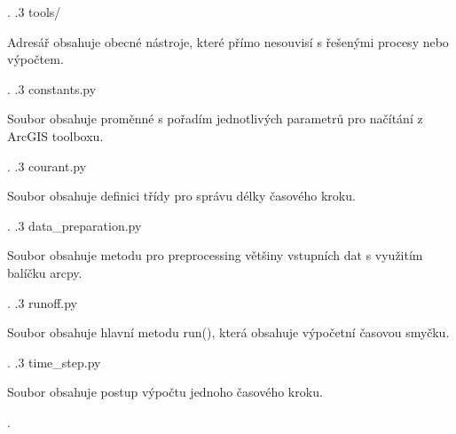 \documentclass[%
    ,float=false %
    ,preview=true
    ,class=scrartcl
    ,fontsize=12pt
    ]{standalone}
\def\pomer{0.5}
\begin{document}
{\begin{minipage}[t]{\pomer\textwidth}
                             \end{minipage}.
.3 tools/    \dotfill \begin{minipage}[t]{\pomer\textwidth}
    Adresář obsahuje obecné nástroje, které přímo nesouvisí s řešenými procesy nebo výpočtem{.}
    \end{minipage}.
.3 constants.py    \dotfill \begin{minipage}[t]{\pomer\textwidth}
        Soubor obsahuje proměnné s pořadím jednotlivých parametrů pro načítání z ArcGIS toolboxu{.}
        \end{minipage}.
.3 courant.py    \dotfill \begin{minipage}[t]{\pomer\textwidth}
        Soubor obsahuje definici třídy pro správu délky časového kroku{.}
        \end{minipage}.
.3 data\_preparation.py    \dotfill \begin{minipage}[t]{\pomer\textwidth}
        Soubor obsahuje metodu pro preprocessing většiny vstupních dat s využitím balíčku arcpy{.}
        \end{minipage}.
.3 runoff.py    \dotfill \begin{minipage}[t]{\pomer\textwidth}
        Soubor obsahuje hlavní metodu run(), která obsahuje výpočetní časovou smyčku{.}
        \end{minipage}.
.3 time\_step.py  \dotfill \begin{minipage}[t]{\pomer\textwidth}
        Soubor obsahuje postup výpočtu jednoho časového kroku{.}
        \end{minipage}.
}
\end{document}

